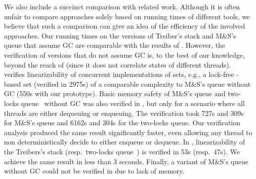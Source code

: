%
We also include a succinct comparison with related work. Although it is
often unfair to compare approaches solely based on running times of
different tools, we believe that such a comparison can give an idea of
the efficiency of the involved approaches.
%
Our running times on the versions of Treiber's stack and M\&S's queue
that assume GC are comparable with the results of
\cite{Vafeiadis:RGSep}. However, the verification of versions that do
not assume GC is, to the best of our knowledge, beyond the reach of
\cite{Vafeiadis:RGSep} (since it does not correlate states of different threads). 
%
\cite{Sagiv:correlation} verifies linearizability of concurrent
implementations of sets,  e.g., a lock-free -based set
\cite{Vechev:PLDI08} (verified in 2975s) of a comparable complexity to
M\&S's queue without GC (550s with our prototype).
%
Basic memory safety of M\&S's queue and two-locks
queue~\cite{MS:QueueAlgorithms} without GC was also verified in
\cite{YaSa:queue}, but only for a scenario where all threads are
either dequeuing or enqueuing. The verification took 727s and 309s for
M\&S's queue and 6162s and 304s for the two-locks queue. Our
verification analysis produced the same result significantly faster,
even allowing any thread to non deterministically decide to either
enqueue or dequeue.
%
In \cite{BLMRS:cav08}, linearizability of the Treibers's stack (resp.\
two-locks queue~\cite{MS:QueueAlgorithms}) is verified in 53s (resp.\
47s). We achieve the same result in less than 3 seconds. 
Finally, a variant of M\&S's queue without GC could not be %
verified in \cite{BLMRS:cav08} 
due to lack of memory.
